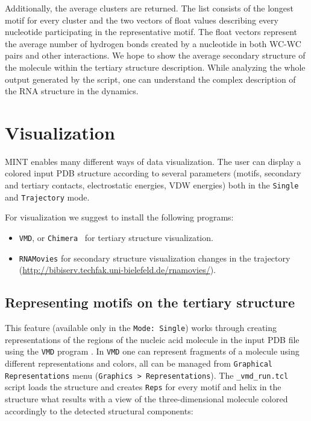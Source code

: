 \documentclass[12pt]{article}
\begin{document}
Additionally, the average clusters are returned. The list consists of the longest motif for every cluster and the two vectors of float values describing every nucleotide participating in the representative motif. The float vectors represent the average number of hydrogen bonds created by a nucleotide in both WC-WC pairs and other interactions. We hope to show the average secondary structure of the molecule within the tertiary structure description. While analyzing the whole output generated by the script, one can understand the complex description of the RNA structure in the dynamics.

\newpage
\section{Visualization}\label{Visualization}
MINT enables many different ways of data visualization. The user can display a colored input PDB structure according to several parameters (motifs, secondary and tertiary contacts, electrostatic energies, VDW energies) both in the {\tt Single} and {\tt Trajectory} mode. 

For visualization we suggest to install the following programs:
\begin{itemize}
\item {\tt VMD}\cite{Humphrey1996}, or {\tt Chimera}~\cite{Pettersen2004} for tertiary structure visualization.
\item {\tt RNAMovies} for secondary structure visualization changes in the trajectory\\(\url{http://bibiserv.techfak.uni-bielefeld.de/rnamovies/}).
\end{itemize}

\subsection{Representing motifs on the tertiary structure} 
\label{VMD}
This feature (available only in the {\tt Mode: Single}) works through creating representations of the regions of the nucleic acid molecule in the input PDB file using the {\tt VMD} program \cite{Humphrey1996}. In {\tt VMD} one can represent fragments of a molecule using different representations and colors, all can be managed from {\tt Graphical Representations} menu ({\tt Graphics > Representations}). The {\tt \_vmd\_run.tcl} script loads the structure and creates {\tt Reps} for every motif and helix in the structure what results with a view of the three-dimensional molecule colored accordingly to the detected structural components:
\end{document}
